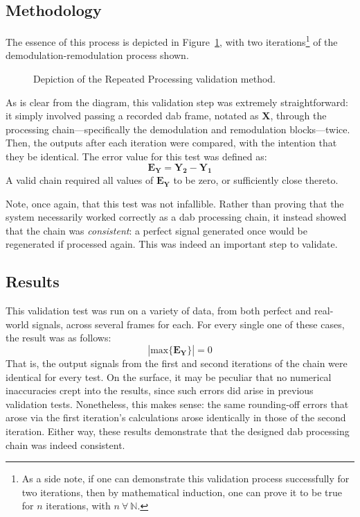 \documentclass[class=report,11pt,crop=false]{standalone}
\begin{document}
\subsection{Methodology}
The essence of this process is depicted in Figure~\ref{fig:repeated-process-diagram}, with two iterations\footnote{As a side note, if one can demonstrate this validation process successfully for two iterations, then by mathematical induction, one can prove it to be true for \(n\) iterations, with \(n \: \forall \: \mathbb{N}\).} of the demodulation-remodulation process shown.
\begin{figure}[htbp]
  \centering
  \captionsetup{type=figure}
  \def\svgwidth{\linewidth}
  { %
      }
  \caption{Depiction of the Repeated Processing validation method.}
  \label{fig:repeated-process-diagram}
\end{figure}
As is clear from the diagram, this validation step was extremely straightforward: it simply involved passing a recorded \gls{dab} frame, notated as \(\mathbf{X}\), through the processing chain---specifically the demodulation and remodulation blocks---twice. Then, the outputs after each iteration were compared, with the intention that they be identical. The error value for this test was defined as:
\begin{equation}
  \mathbf{E_{Y}} = \mathbf{Y_2} - \mathbf{Y_1}
\end{equation}
A valid chain required all values of \(\mathbf{E_Y}\) to be zero, or sufficiently close thereto.

Note, once again, that this test was not infallible. Rather than proving that the system necessarily worked correctly as a \gls{dab} processing chain, it instead showed that the chain was \emph{consistent}: a perfect signal generated once would be regenerated if processed again. This was indeed an important step to validate.

\subsection{Results}
This validation test was run on a variety of data, from both perfect and real-world signals, across several frames for each. For every single one of these cases, the result was as follows:
\begin{equation}
  \left| \mathrm{max} \{ \mathbf{E_Y} \} \right| = 0
\end{equation}
That is, the output signals from the first and second iterations of the chain were identical for every test. On the surface, it may be peculiar that no numerical inaccuracies crept into the results, since such errors did arise in previous validation tests. Nonetheless, this makes sense: the same rounding-off errors that arose via the first iteration's calculations arose identically in those of the second iteration. Either way, these results demonstrate that the designed \gls{dab} processing chain was indeed consistent.
\end{document}

